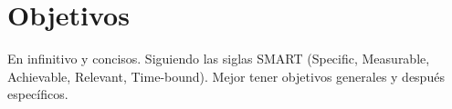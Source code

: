 \section{Objetivos}
En infinitivo y concisos. Siguiendo las siglas SMART (Specific, Measurable, Achievable, Relevant, Time-bound).
Mejor tener objetivos generales y después específicos.
